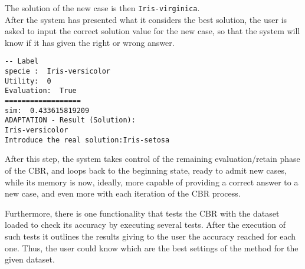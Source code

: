 \documentclass[11pt]{article}
\begin{document}
The solution of the new case is then \texttt{Iris-virginica}.
\\

After the system has presented what it considers the best solution, the user is asked to input the correct solution value for the new case, so that the system will know if it has given the right or wrong answer.
\begin{verbatim}
-- Label
specie :  Iris-versicolor
Utility:  0
Evaluation:  True
==================
sim:  0.433615819209
ADAPTATION - Result (Solution):
Iris-versicolor
Introduce the real solution:Iris-setosa
\end{verbatim}


After this step, the system takes control of the remaining evaluation/retain phase of the CBR, and loops back to the beginning state, ready to admit new cases, while its memory is now, ideally, more capable of providing a correct answer to a new case, and even more with each iteration of the CBR process.

Furthermore, there is one functionality that tests the CBR with the dataset loaded to check its accuracy by executing several tests. After the execution of such tests it outlines the results giving to the user the accuracy reached for each one. Thus, the user could know which are the best settings of the method for the given dataset.
\end{document}
